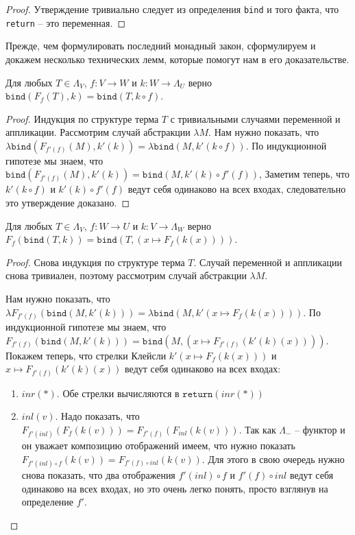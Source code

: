 \begin{proof}
  Утверждение тривиально следует из определения \texttt{bind} и того факта, что \texttt{return} -- это переменная.
\end{proof}

Прежде, чем формулировать последний монадный закон, сформулируем и докажем несколько технических лемм, которые помогут нам в его доказательстве.

\begin{lemma}
  \label{monad:bind-fmap-comm-rhs}
  Для любых $T \in \Lambda_{V}$, $f : V \to W$ и $k : W \to \Lambda_{U}$ верно $\texttt{bind}(F_{f}(T), k) = \texttt{bind}(T, k \circ f)$.
\end{lemma}

\begin{proof}
  Индукция по структуре терма $T$ с тривиальными случаями переменной и аппликации. Рассмотрим случай абстракции $\lambda M$. Нам нужно показать, что $\lambda \texttt{bind}(F_{f'(f)}(M), k'(k)) = \lambda \texttt{bind}(M, k'(k \circ f))$. По индукционной гипотезе мы знаем, что $\texttt{bind}(F_{f'(f)}(M), k'(k)) = \texttt{bind}(M, k'(k) \circ f'(f))$, Заметим теперь, что $k'(k \circ f)$ и $k'(k) \circ f'(f)$ ведут себя одинаково на всех входах, следовательно это утверждение доказано.
\end{proof}

\begin{lemma}
  \label{monad:bind-fmap-comm-lhs}
  Для любых $T \in \Lambda_{V}$, $f : W \to U$ и $k : V \to \Lambda_{W}$ верно $ F_{f}(\texttt{bind}(T, k)) = \texttt{bind}(T, (x \mapsto F_{f}(k(x))))$.
\end{lemma}

\begin{proof}
  Снова индукция по структуре терма $T$. Случай переменной и аппликации снова тривиален, поэтому рассмотрим случай абстракции $\lambda M$.

  Нам нужно показать, что $\lambda F_{f'(f)}(\texttt{bind}(M, k'(k))) = \lambda \texttt{bind}(M, k'(x \mapsto F_{f}(k(x))))$. По индукционной гипотезе мы знаем, что $F_{f'(f)}(\texttt{bind}(M, k'(k))) = \texttt{bind}(M, (x \mapsto F_{f'(f)}(k'(k)(x))))$. Покажем теперь, что стрелки Клейсли $ k'(x \mapsto F_{f}(k(x))) $ и $ x \mapsto F_{f'(f)}(k'(k)(x)) $ ведут себя одинаково на всех входах:

  \begin{enumerate}
    \item $inr(*)$. Обе стрелки вычисляются в $\texttt{return}(inr(*))$
    \item $inl(v)$. Надо показать, что $F_{f'(inl)}(F_{f}(k(v))) = F_{f'(f)}(F_{inl}(k(v)))$. Так как $\Lambda_{-}$ -- функтор и он уважает композицию отображений имеем, что нужно показать $F_{f'(inl) \circ f}(k(v)) = F_{f'(f) \circ inl}(k(v))$. Для этого в свою очередь нужно снова показать, что два отображения $f'(inl) \circ f$ и $f'(f) \circ inl$ ведут себя одинаково на всех входах, но это очень легко понять, просто взглянув на определение $f'$.
  \end{enumerate}
\end{proof}

